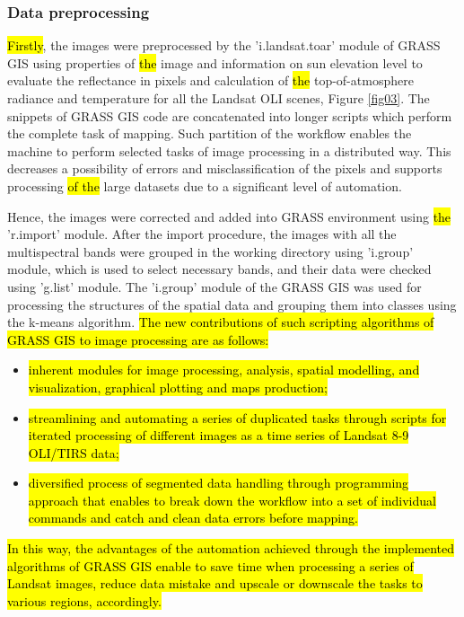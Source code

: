 \documentclass[land,article,submit,pdftex,moreauthors]{Definitions/mdpi}
\begin{document}
\subsubsection{Data preprocessing}
\hl{Firstly}, the images were preprocessed by the 'i.landsat.toar' module of GRASS GIS using properties of \hl{the }image and information on sun elevation level to evaluate the reflectance in pixels and calculation of \hl{the }top-of-atmosphere radiance and temperature for all the Landsat OLI scenes, Figure \ref{fig03}. The snippets of GRASS GIS code are concatenated into longer scripts which perform the complete task of mapping. Such\hl{ }partition of the workflow enables the machine to perform selected tasks of image processing in a distributed way. This decreases a possibility of errors and misclassification of the pixels and supports processing \hl{of the }large datasets due to a significant level of automation. 

Hence, the images were corrected and added into GRASS environment using \hl{the }'r.import' module. After the import procedure, the images with all the multispectral bands were grouped in the working directory using 'i.group' module, which is used to select necessary bands, and their data were checked using 'g.list' module. The 'i.group' module of the GRASS GIS was used for processing the structures of the spatial data and grouping them into classes using the k-means algorithm. \hl{The new contributions of such scripting algorithms of GRASS GIS to image processing are as follows: }
\begin{itemize}
	\item \hl{inherent modules for image processing, analysis, spatial modelling, and visualization, graphical plotting and maps production; }
	\item \hl{streamlining and automating a series of duplicated tasks through scripts for iterated processing of different images as a time series of Landsat 8-9 OLI/TIRS data; }
	\item \hl{diversified process of segmented data handling through programming approach that enables to break down the workflow into a set of individual commands and catch and clean data errors before mapping.}
\end{itemize}
\hl{ In this way, the advantages of the automation achieved through the implemented algorithms of GRASS GIS enable to save time when processing a series of Landsat images, reduce data mistake and upscale or downscale the tasks to various regions, accordingly.}
\end{document}
